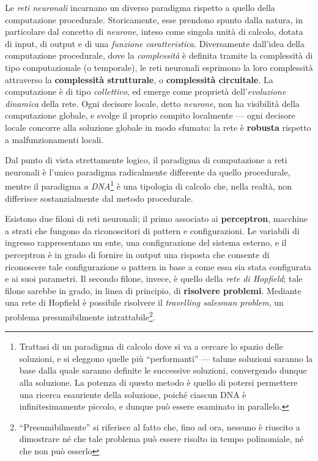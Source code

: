 \documentclass[10pt]{book}
\begin{document}
Le \emph{reti neuronali} incarnano un diverso paradigma rispetto a quello della
computazione procedurale. Storicamente, esse prendono spunto dalla natura, in
particolare dal concetto di \emph{neurone}, inteso come singola unità di
calcolo, dotata di input, di output e di una \emph{funzione caratteristica}.
Diversamente dall'idea della computazione procedurale, dove la
\emph{complessità} è definita tramite la complessità di tipo computazionale (o
temporale), le reti neuronali esprimono la loro complessità attraverso la
\textbf{complessità strutturale}, o \textbf{complessità circuitale}. La
computazione è di tipo \emph{collettivo}, ed emerge come proprietà
dell'\emph{evoluzione dinamica} della rete. Ogni decisore locale, detto
\emph{neurone}, non ha visibilità della computazione globale, e svolge il
proprio compito localmente \---- ogni decisore locale concorre alla soluzione
globale in modo sfumato: la rete è \textbf{robusta} rispetto a malfunzionamenti
locali.

Dal punto di vista strettamente logico, il paradigma di computazione a reti
neuronali è l'unico paradigma radicalmente differente da quello procedurale,
mentre il paradigma \emph{a DNA}\footnote{Trattasi di un paradigma di calcolo
dove si va a cercare lo spazio delle soluzioni, e si eleggono quelle più
``performanti'' \---- talune soluzioni saranno la base dalla quale saranno
definite le successive soluzioni, convergendo dunque alla soluzione. La potenza
di questo metodo è quello di potersi permettere una ricerca esauriente della
soluzione, poiché ciascun DNA è infinitesimamente piccolo, e dunque può essere
esaminato in parallelo.} è una tipologia di calcolo che, nella realtà, non
differisce sostanzialmente dal metodo procedurale.

Esistono due filoni di reti neuronali; il primo associato ai
\textbf{perceptron}, macchine a strati che fungono da riconoscitori di pattern
e configurazioni. Le variabili di ingresso rappresentano un ente, una
configurazione del sistema esterno, e il perceptron è in grado di fornire in
output una risposta che consente di riconoscere tale configurazione o pattern
in base a come essa sia stata configurata e ai suoi parametri. Il secondo
filone, invece, è quello della \emph{rete di Hopfield}; tale filone sarebbe in
grado, in linea di principio, di \textbf{risolvere problemi}. Mediante una
rete di Hopfield è possibile risolvere il \emph{travelling salesman problem},
un problema presumibilmente intrattabile\footnote{``Presumibilmente'' si
riferisce al fatto che, fino ad ora, nessuno è riuscito a dimostrare né che
tale problema può essere risolto in tempo polinomiale, né che non può esserlo}.
\end{document}
